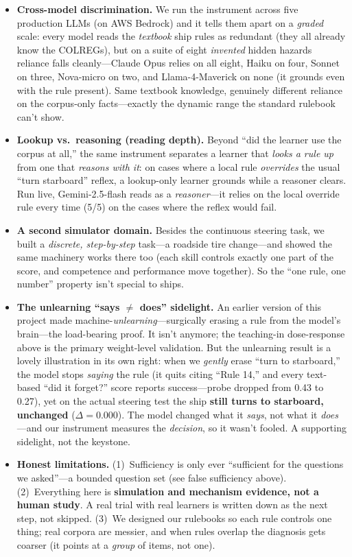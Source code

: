 \documentclass[11pt]{article}
\begin{document}
\begin{itemize}[leftmargin=1.4em]
  \item \textbf{Cross-model discrimination.} We run the instrument across five production LLMs (on
  AWS Bedrock) and it tells them apart on a \emph{graded} scale: every model reads the
  \emph{textbook} ship rules as redundant (they all already know the COLREGs), but on a suite of
  eight \emph{invented} hidden hazards reliance falls cleanly---Claude Opus relies on all eight,
  Haiku on four, Sonnet on three, Nova-micro on two, and Llama-4-Maverick on none (it grounds even
  with the rule present). Same textbook knowledge, genuinely different reliance on the corpus-only
  facts---exactly the dynamic range the standard rulebook can't show.
  \item \textbf{Lookup vs.\ reasoning (reading depth).} Beyond ``did the learner use the corpus at
  all,'' the same instrument separates a learner that \emph{looks a rule up} from one that
  \emph{reasons with it}: on cases where a local rule \emph{overrides} the usual ``turn starboard''
  reflex, a lookup-only learner grounds while a reasoner clears. Run live, Gemini-2.5-flash reads as
  a \emph{reasoner}---it relies on the local override rule every time (5/5) on the cases where the
  reflex would fail.
  \item \textbf{A second simulator domain.} Besides the continuous steering task, we built a
  \emph{discrete, step-by-step} task---a roadside tire change---and showed the same machinery
  works there too (each skill controls exactly one part of the score, and competence and
  performance move together). So the ``one rule, one number'' property isn't special to ships.
  \item \textbf{The unlearning ``says $\ne$ does'' sidelight.} An earlier version of this project
  made machine-\emph{unlearning}---surgically erasing a rule from the model's brain---the
  load-bearing proof. It isn't anymore; the teaching-in dose-response above is the primary
  weight-level validation. But the unlearning result is a lovely illustration in its own right:
  when we \emph{gently} erase ``turn to starboard,'' the model stops \emph{saying} the rule (it
  quits citing ``Rule 14,'' and every text-based ``did it forget?'' score reports success---probe
  dropped from 0.43 to 0.27), yet on the actual steering test the ship \textbf{still turns to
  starboard, unchanged} ($\Delta = 0.000$). The model changed what it \emph{says}, not what it
  \emph{does}---and our instrument measures the \emph{decision}, so it wasn't fooled. A supporting
  sidelight, not the keystone.
  \item \textbf{Honest limitations.} (1)~Sufficiency is only ever ``sufficient for the questions we
  asked''---a bounded question set (see false sufficiency above). (2)~Everything here is
  \textbf{simulation and mechanism evidence, not a human study}. A real trial with real learners is
  written down as the next step, not skipped. (3)~We designed our rulebooks so each rule controls
  one thing; real corpora are messier, and when rules overlap the diagnosis gets coarser (it points
  at a \emph{group} of items, not one).
\end{itemize}
\end{document}
